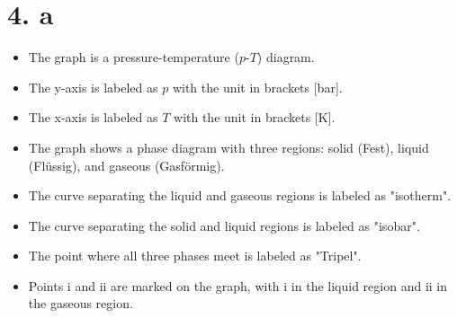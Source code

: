 \section*{4. a}

\begin{itemize}
    \item The graph is a pressure-temperature ($p$-$T$) diagram.
    \item The y-axis is labeled as $p$ with the unit in brackets [bar].
    \item The x-axis is labeled as $T$ with the unit in brackets [K].
    \item The graph shows a phase diagram with three regions: solid (Fest), liquid (Flüssig), and gaseous (Gasförmig).
    \item The curve separating the liquid and gaseous regions is labeled as "isotherm".
    \item The curve separating the solid and liquid regions is labeled as "isobar".
    \item The point where all three phases meet is labeled as "Tripel".
    \item Points i and ii are marked on the graph, with i in the liquid region and ii in the gaseous region.
\end{itemize}